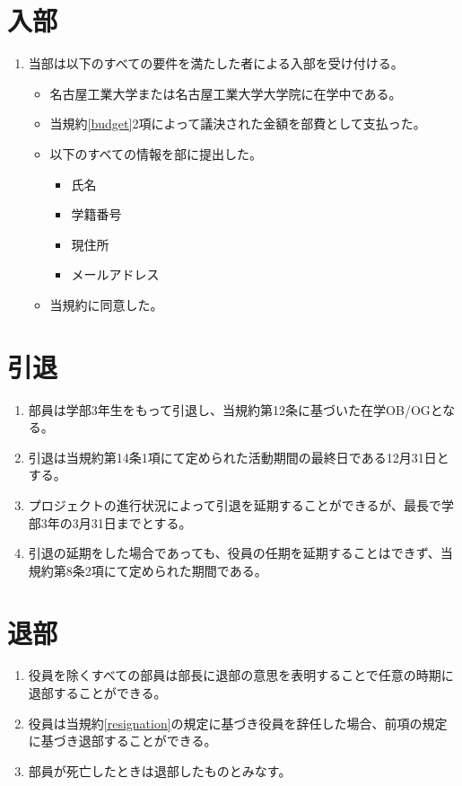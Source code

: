 \documentclass[12pt, unicode, a4paper]{ltjsreport}
\begin{document}
    \section{入部}
        \begin{enumerate}
            \item 当部は以下のすべての要件を満たした者による入部を受け付ける。
            \begin{itemize}
                \item 名古屋工業大学または名古屋工業大学大学院に在学中である。
                \item 当規約\ref{budget}2項によって議決された金額を部費として支払った。
                \item 以下のすべての情報を部に提出した。
                \begin{itemize}
                    \item 氏名
                    \item 学籍番号
                    \item 現住所
                    \item メールアドレス
                \end{itemize}
                \item 当規約に同意した。
            \end{itemize}
        \end{enumerate}
    
    \section{引退}
        \begin{enumerate}    
            \item 部員は学部3年生をもって引退し、当規約第12条に基づいた在学OB/OGとなる。
            \item 引退は当規約第14条1項にて定められた活動期間の最終日である12月31日とする。
            \item プロジェクトの進行状況によって引退を延期することができるが、最長で学部3年の3月31日までとする。
            \item 引退の延期をした場合であっても、役員の任期を延期することはできず、当規約第8条2項にて定められた期間である。
        \end{enumerate}

    \section{退部}
        \begin{enumerate}
            \item 役員を除くすべての部員は部長に退部の意思を表明することで任意の時期に退部することができる。
            \item 役員は当規約\ref{resignation}の規定に基づき役員を辞任した場合、前項の規定に基づき退部することができる。
            \item 部員が死亡したときは退部したものとみなす。
        \end{enumerate}
\end{document}
